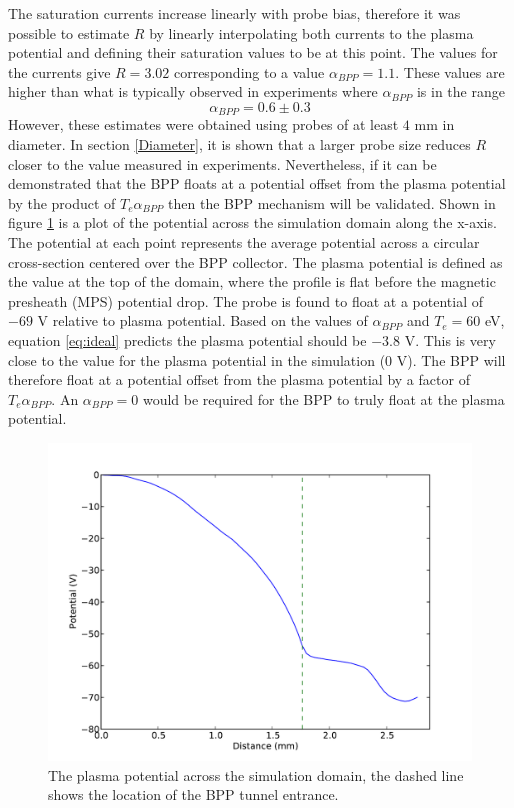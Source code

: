   
The saturation currents increase linearly with probe bias, therefore it was possible to estimate $R$ by linearly interpolating both currents to the plasma potential and defining their saturation values to be at this point. The values for the currents give $R =3.02$ corresponding to a value $\alpha_{BPP}= 1.1$. These values are higher than what is typically observed in experiments where $\alpha_{BPP}$ is in the range 
\begin{equation}
\alpha_{BPP} = 0.6 \pm 0.3 
\label{eq:accepted_range}
\end{equation}
However, these estimates were obtained using probes of at least $4$ mm in diameter. In section \ref{Diameter}, it is shown that a larger probe size reduces $R$ closer to the value measured in experiments. Nevertheless, if it can be demonstrated that the BPP floats at a potential offset from the plasma potential by the product of $T_e \alpha_{BPP}$ then the BPP mechanism will be validated. Shown in figure \ref{fig:potential_profile} is a plot of the potential across the simulation domain along the x-axis. The potential at each point represents the average potential across a circular cross-section centered over the BPP collector. The plasma potential is defined as the value at the top of the domain, where the profile is flat before the magnetic presheath (MPS) potential drop. The probe is found to float at a potential of $-69$ V relative to plasma potential. Based on the values of $\alpha_{BPP}$ and $T_e = 60$ eV,  equation \ref{eq:ideal} predicts the plasma potential should be $-3.8$ V.  This is very close to the value for the plasma potential in the simulation (0 V). The BPP will therefore float at a potential offset from the plasma potential by a factor of $T_e \alpha_{BPP}$. An $\alpha_{BPP} = 0$ would be required for the BPP to truly float at the plasma potential.


\begin{figure}
	\begin{center}
		\includegraphics[width=.75\textwidth]{figure5.pdf}
		\caption{The plasma potential across the simulation domain, the dashed line shows the location of the BPP tunnel entrance. }
		\label{fig:potential_profile}
	\end{center}
\end{figure}


